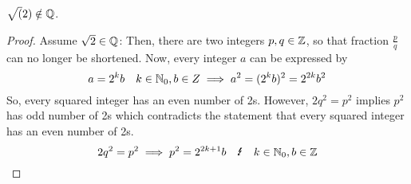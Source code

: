\begin{lemma}
    $\sqrt(2) \notin \mathbb{Q}$.
\end{lemma}
\begin{proof}
    Assume $\sqrt{2} \in \mathbb{Q}$:
    Then, there are two integers $p,q \in \mathbb{Z}$, so that fraction $\frac{p}{q}$ 
    can no longer be shortened.
    Now, every integer $a$ can be expressed by 
    \begin{equation}
        a = 2^k b \quad k \in \mathbb{N}_0, b \in Z \implies a^2 = (2^k b)^2 = 2^{2k} b^2
    \end{equation}
    So, every squared integer has an even number of 2s.
    However, $2 q^2 = p^2$ implies $p^2$ has odd number of 2s which contradicts the statement 
    that every squared integer has an even number of 2s.
    \begin{equation}
        2 q^2 = p^2 \implies p^2 = 2^{2k+1} b \quad \blitz  \quad k \in \Nzero, b \in \Z
    \end{equation}
\end{proof}
